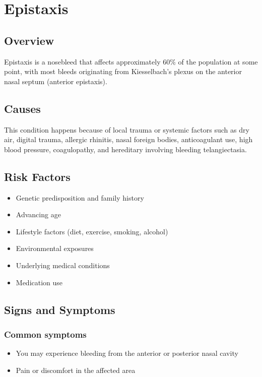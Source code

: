 \chapter{Epistaxis}
\label{sec:Epistaxis}

\section{Overview}
Epistaxis is a nosebleed that affects approximately 60\% of the population at some point, with most bleeds originating from Kiesselbach's plexus on the anterior nasal septum (anterior epistaxis).
\section{Causes}
This condition happens because of local trauma or systemic factors such as dry air, digital trauma, allergic rhinitis, nasal foreign bodies, anticoagulant use, high blood pressure, coagulopathy, and hereditary involving bleeding telangiectasia.     
\section{Risk Factors}

\begin{itemize}[noitemsep]
  \item Genetic predisposition and family history
  \item Advancing age
  \item Lifestyle factors (diet, exercise, smoking, alcohol)
  \item Environmental exposures
  \item Underlying medical conditions
  \item Medication use
\end{itemize}
\section{Signs and Symptoms}

\subsection{Common symptoms}
\begin{itemize}[noitemsep]
  \item You may experience bleeding from the anterior or posterior nasal cavity

  \item Pain or discomfort in the affected area
  \end{itemize}


